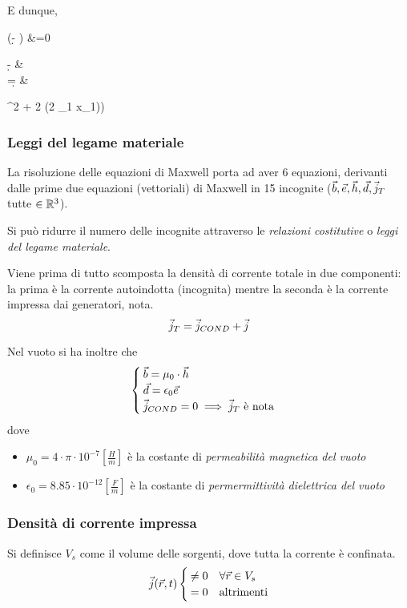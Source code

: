 E dunque,
\begin{esp}
	 \left(\diverg \d - \rho \right) &=0 \implies
	\begin{cases}
		\diverg \d - \rho &  \\
		\diverg \d = \rho & 
	\end{cases}
\end{esp}
\rho^2 + 2 \rho \cos(2 \beta_1 x_1)) \\
\subsubsection{Leggi del legame materiale}
La risoluzione delle equazioni di Maxwell porta ad aver 6 equazioni, derivanti dalle prime due equazioni (vettoriali) di Maxwell in 15 incognite ($\vec{b} , \vec{e} , \vec{h} , \vec{d} , \vec{j}_T $ tutte $\in \mathbb{R}^3$).

Si può ridurre il numero delle incognite attraverso le \emph{relazioni costitutive} o \emph{leggi del legame materiale}.

Viene prima di tutto scomposta la densità di corrente totale in due componenti: la prima è la corrente autoindotta (incognita) mentre la seconda è la corrente impressa dai generatori, nota.
\begin{equation}
	\vec{j}_T = \vec{j}_{COND} + \vec{j}
\end{equation}

Nel vuoto si ha inoltre che
\begin{equation}
	\begin{cases}
		\vec{b} = \mu_0 \cdot \vec{h} \\
		\vec{d} = \epsilon_0 \vec{e} \\
		\vec{j}_{COND} = 0 \implies \vec{j}_T \text{ è nota} \\
	\end{cases}
	\label{eq:bh-de-j}
\end{equation}
dove
\begin{itemize}
	\item $\mu_0 = 4\cdot \pi \cdot 10^{-7} \left[\frac{H}{m}\right]$ è la costante di \emph{permeabilità
	magnetica del vuoto}
	\item $\epsilon_0 = 8.85 \cdot 10^{-12} \left[\frac{F}{m}\right]$ è la costante di \emph{permermittività
	dielettrica del vuoto}
\end{itemize}

\subsubsection{Densità di corrente impressa}
Si definisce $V_s$ come il volume delle sorgenti, dove tutta la corrente è confinata.
\begin{equation} \vec{j}(\vec{r},t)
	\begin{cases}
		\neq 0 & \forall \vec{r} \in V_s \\
		=0 & \text{altrimenti}
	\end{cases}
	\label{eq:correnti}
\end{equation}

